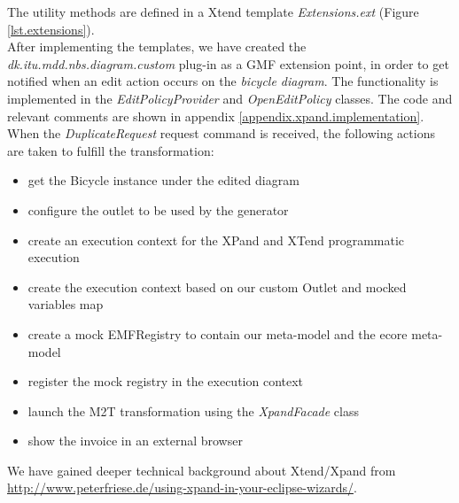 \noindent The utility methods are defined in a Xtend template
\emph{Extensions.ext} (Figure \ref{lst.extensions}).\\

\noindent After implementing the templates, we have created the
\emph{dk.itu.mdd.nbs.diagram.custom} plug-in as a GMF extension point, in order
to get notified when an edit action occurs on the \emph{bicycle diagram}. The
functionality is implemented in the \emph{EditPolicyProvider} and
\emph{OpenEditPolicy} classes. The code and relevant comments are shown in
appendix \ref{appendix.xpand.implementation}. When the \emph{DuplicateRequest} request command is received,
the following actions are taken to fulfill the transformation:
\begin{itemize}
  \item get the Bicycle instance under the edited diagram
  \item configure the outlet to be used by the generator
  \item create an execution context for the XPand and XTend programmatic
  execution
  \item create the execution context based on our custom Outlet and
  mocked variables map
  \item create a mock EMFRegistry to contain our meta-model and the
  ecore meta-model
  \item register the mock registry in the execution context
  \item launch the M2T transformation using the \emph{XpandFacade} class
  \item show the invoice in an external browser\\
\end{itemize}

\noindent We have gained deeper technical background about Xtend/Xpand from
\url{http://www.peterfriese.de/using-xpand-in-your-eclipse-wizards/}.
